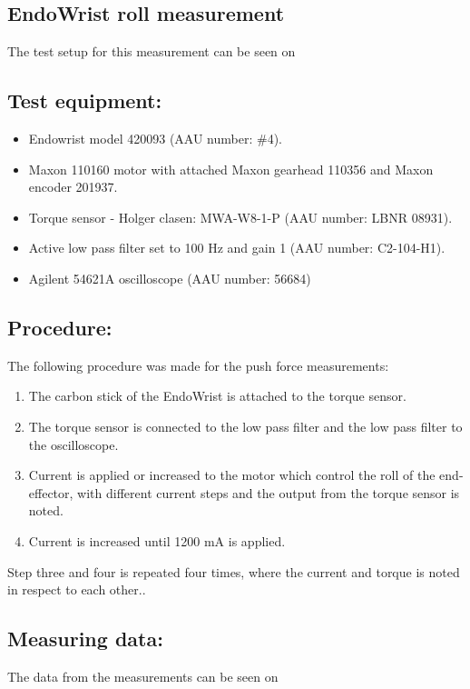 \subsection{EndoWrist roll measurement}%
The test setup for this measurement can be seen on 

\subsection*{Test equipment:}
\begin{itemize}
\item Endowrist model 420093 (AAU number: \#4).
\item Maxon 110160 motor with attached Maxon gearhead 110356 and Maxon encoder 201937.
\item Torque sensor - Holger clasen: MWA-W8-1-P (AAU number: LBNR 08931).
\item Active low pass filter set to 100 Hz and gain 1 (AAU number: C2-104-H1).
\item Agilent 54621A oscilloscope (AAU number: 56684)
\end{itemize}

\subsection*{Procedure:}
The following procedure was made for the push force measurements:
\begin{enumerate}
\item The carbon stick of the EndoWrist is attached to the torque sensor. 
\item The torque sensor is connected to the low pass filter and the low pass filter to the oscilloscope.
\item Current is applied or increased to the motor which control the roll of the end-effector, with different current steps and the output from the torque sensor is noted.
\item Current is increased until 1200 mA is applied.
\end{enumerate}
Step three and four is repeated four times, where the current and torque is noted in respect to each other.. 

\subsection*{Measuring data:}
The data from the measurements can be seen on 

